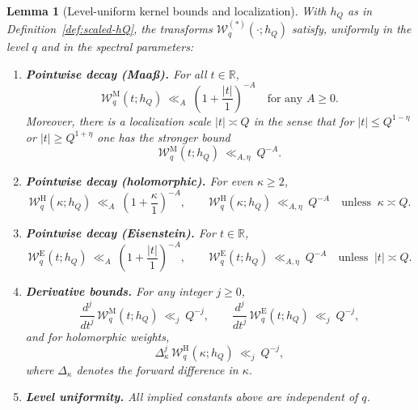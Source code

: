 \documentclass[11pt]{article}
\newtheorem{lemma}{Lemma}[part]
\theoremstyle{definition}
\theoremstyle{remark}
\numberwithin{equation}{part}
\begin{document}
\begin{lemma}[Level-uniform kernel bounds and localization]\label{lem:kuznetsov-uniform}
	With $h_Q$ as in Definition~\ref{def:scaled-hQ}, the transforms $\mathcal W_q^{(*)}(\cdot;h_Q)$ satisfy, uniformly in the level $q$ and in the spectral parameters:
	\begin{enumerate}[label=(\alph*), leftmargin=2em]
		\item \textbf{Pointwise decay (Maa\ss).} For all $t\in\mathbb R$,
		      \[
			      \mathcal W_q^{\mathrm{M}}(t;h_Q)\ \ll_A\ \left(1+\frac{|t|}{1}\right)^{-A}
			      \quad\text{for any }A\ge0.
		      \]
		      Moreover, there is a \emph{localization scale} $|t|\asymp Q$ in the sense that for $|t|\le Q^{1-\eta}$ or $|t|\ge Q^{1+\eta}$ one has the stronger bound
		      \[
			      \mathcal W_q^{\mathrm{M}}(t;h_Q)\ \ll_{A,\eta}\ Q^{-A}.
		      \]
		\item \textbf{Pointwise decay (holomorphic).} For even $\kappa\ge2$,
		      \[
			      \mathcal W_q^{\mathrm{H}}(\kappa;h_Q)\ \ll_A\ \left(1+\frac{\kappa}{1}\right)^{-A},
			      \qquad
			      \mathcal W_q^{\mathrm{H}}(\kappa;h_Q)\ \ll_{A,\eta}\ Q^{-A}\quad\text{unless }\ \kappa\asymp Q.
		      \]
		\item \textbf{Pointwise decay (Eisenstein).} For $t\in\mathbb R$,
		      \[
			      \mathcal W_q^{\mathrm{E}}(t;h_Q)\ \ll_A\ \left(1+\frac{|t|}{1}\right)^{-A},
			      \qquad
			      \mathcal W_q^{\mathrm{E}}(t;h_Q)\ \ll_{A,\eta}\ Q^{-A}\quad\text{unless }\ |t|\asymp Q.
		      \]
		\item \textbf{Derivative bounds.} For any integer $j\ge0$,
		      \[
			      \frac{d^j}{dt^j}\,\mathcal W_q^{\mathrm{M}}(t;h_Q)\ \ll_{j}\ Q^{-j},\qquad
			      \frac{d^j}{dt^j}\,\mathcal W_q^{\mathrm{E}}(t;h_Q)\ \ll_{j}\ Q^{-j},
		      \]
		      and for holomorphic weights,
		      \[
			      \Delta_\kappa^j\,\mathcal W_q^{\mathrm{H}}(\kappa;h_Q)\ \ll_{j}\ Q^{-j},
		      \]
		      where $\Delta_\kappa$ denotes the forward difference in $\kappa$.
		\item \textbf{Level uniformity.} All implied constants above are \emph{independent of $q$}.
	\end{enumerate}
\end{lemma}
\end{document}
